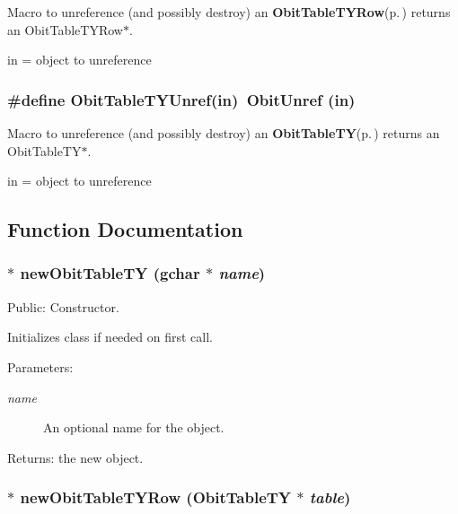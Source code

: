 Macro to unreference (and possibly destroy) an {\bf Obit\-Table\-TYRow}{\rm (p.\,\pageref{structObitTableTYRow})} returns an Obit\-Table\-TYRow$\ast$. 

in = object to unreference 
\subsubsection{\setlength{\rightskip}{0pt plus 5cm}\#define Obit\-Table\-TYUnref(in)\ Obit\-Unref (in)}\label{ObitTableTY_8h_a1}


Macro to unreference (and possibly destroy) an {\bf Obit\-Table\-TY}{\rm (p.\,\pageref{structObitTableTY})} returns an Obit\-Table\-TY$\ast$. 

in = object to unreference 

\subsection{Function Documentation}
\subsubsection{$\ast$ new\-Obit\-Table\-TY (gchar $\ast$ {\em name})}\label{ObitTableTY_8h_a11}


Public: Constructor. 

Initializes class if needed on first call. \begin{Desc}
\item[Parameters:]
\begin{description}
\item[{\em name}]An optional name for the object. \end{description}
\end{Desc}
\begin{Desc}
\item[Returns:]the new object. \end{Desc}
\subsubsection{$\ast$ new\-Obit\-Table\-TYRow ({\bf Obit\-Table\-TY} $\ast$ {\em table})}\label{ObitTableTY_8h_a8}


